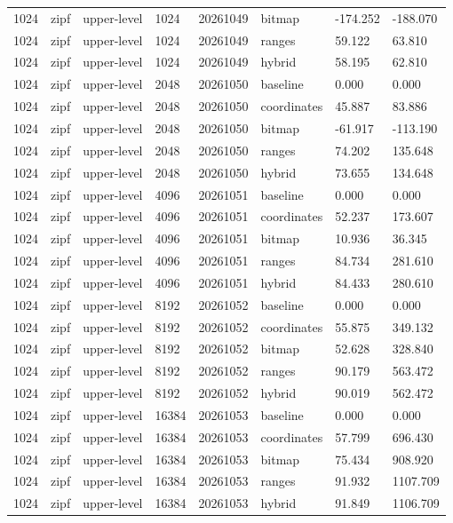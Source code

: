 \begin{tabular}{llllllll}
1024 & zipf & upper-level & 1024 & 20261049 & bitmap & -174.252 & -188.070 \\
1024 & zipf & upper-level & 1024 & 20261049 & ranges & 59.122 & 63.810 \\
1024 & zipf & upper-level & 1024 & 20261049 & hybrid & 58.195 & 62.810 \\
1024 & zipf & upper-level & 2048 & 20261050 & baseline & 0.000 & 0.000 \\
1024 & zipf & upper-level & 2048 & 20261050 & coordinates & 45.887 & 83.886 \\
1024 & zipf & upper-level & 2048 & 20261050 & bitmap & -61.917 & -113.190 \\
1024 & zipf & upper-level & 2048 & 20261050 & ranges & 74.202 & 135.648 \\
1024 & zipf & upper-level & 2048 & 20261050 & hybrid & 73.655 & 134.648 \\
1024 & zipf & upper-level & 4096 & 20261051 & baseline & 0.000 & 0.000 \\
1024 & zipf & upper-level & 4096 & 20261051 & coordinates & 52.237 & 173.607 \\
1024 & zipf & upper-level & 4096 & 20261051 & bitmap & 10.936 & 36.345 \\
1024 & zipf & upper-level & 4096 & 20261051 & ranges & 84.734 & 281.610 \\
1024 & zipf & upper-level & 4096 & 20261051 & hybrid & 84.433 & 280.610 \\
1024 & zipf & upper-level & 8192 & 20261052 & baseline & 0.000 & 0.000 \\
1024 & zipf & upper-level & 8192 & 20261052 & coordinates & 55.875 & 349.132 \\
1024 & zipf & upper-level & 8192 & 20261052 & bitmap & 52.628 & 328.840 \\
1024 & zipf & upper-level & 8192 & 20261052 & ranges & 90.179 & 563.472 \\
1024 & zipf & upper-level & 8192 & 20261052 & hybrid & 90.019 & 562.472 \\
1024 & zipf & upper-level & 16384 & 20261053 & baseline & 0.000 & 0.000 \\
1024 & zipf & upper-level & 16384 & 20261053 & coordinates & 57.799 & 696.430 \\
1024 & zipf & upper-level & 16384 & 20261053 & bitmap & 75.434 & 908.920 \\
1024 & zipf & upper-level & 16384 & 20261053 & ranges & 91.932 & 1107.709 \\
1024 & zipf & upper-level & 16384 & 20261053 & hybrid & 91.849 & 1106.709 \\

\end{tabular}
